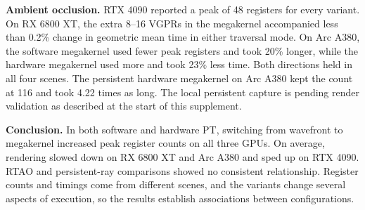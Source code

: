 \par\medskip
\noindent\textbf{Ambient occlusion.}
RTX 4090 reported a peak of 48 registers for every variant. On RX 6800 XT,
the extra 8--16 VGPRs in the megakernel accompanied less than 0.2\% change in
geometric mean time in either traversal mode. On Arc A380, the software
megakernel used fewer peak registers and took 20\% longer, while the
hardware megakernel used more and took 23\% less time. Both directions held in all
four scenes. The persistent hardware megakernel on Arc A380 kept the count at
116 and took 4.22 times as long. The local persistent capture is pending
render validation as described at the start of this supplement.

\par\medskip
\noindent\textbf{Conclusion.}
In both software and hardware PT, switching from wavefront to megakernel
increased peak register counts on all three GPUs. On average, rendering
slowed down on RX 6800 XT and Arc A380 and sped up on RTX 4090. RTAO and
persistent-ray comparisons showed no consistent relationship. Register counts
and timings come from different scenes, and the variants change several
aspects of execution, so the results establish associations between
configurations.
\par\medskip

